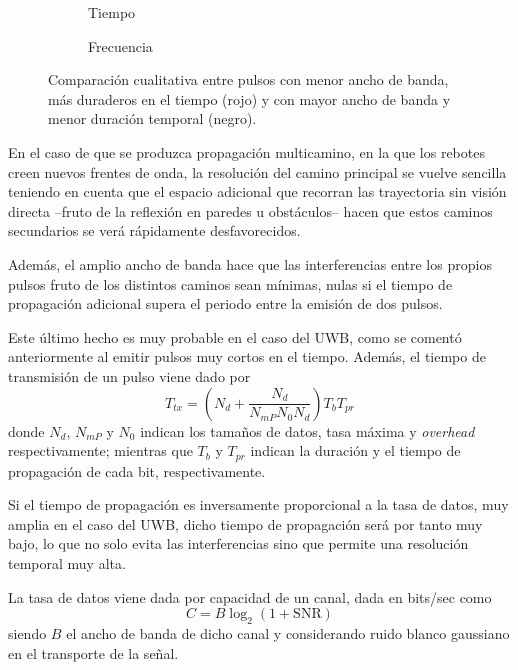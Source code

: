 \begin{figure}[H]
    \begin{subfigure}[b]{.5\textwidth}
      \centering
      \def\svgwidth{0.8\linewidth}
       
      \caption{Tiempo}
      \label{fig:forma_pulsos_tiempo}
    \end{subfigure}
    \begin{subfigure}[b]{.5\textwidth}
      \centering
      \def\svgwidth{0.8\linewidth}
      
      \caption{Frecuencia}
      \label{fig:forma_pulsos_frec}
    \end{subfigure}
    \caption{Comparación cualitativa entre pulsos con menor ancho de banda, más duraderos en el tiempo (rojo) y con mayor ancho de banda y menor duración temporal (negro).}
    \label{fig:forma_pulsos}
  \end{figure}

En el caso de que se produzca propagación multicamino, en la que los rebotes creen nuevos frentes de onda, la resolución del camino principal se vuelve sencilla teniendo en cuenta que el espacio adicional que recorran las trayectoria sin visión directa --fruto de la reflexión en paredes u obstáculos-- hacen que estos caminos secundarios se verá rápidamente desfavorecidos.

Además, el amplio ancho de banda hace que las interferencias entre los propios pulsos fruto de los distintos caminos sean mínimas, nulas si el tiempo de propagación adicional supera el periodo entre la emisión de dos pulsos.

Este último hecho es muy probable en el caso del UWB, como se comentó anteriormente al emitir pulsos muy cortos en el tiempo.
Además, el tiempo de transmisión de un pulso viene dado por\cite{MAIN}
\begin{equation}
    T_{tx} = \left(N_d + \frac{N_d}{N_{mP}N_{0}N_d} \right) T_b T_{pr}
\end{equation}
donde $N_d$, $N_{mP}$ y $N_{0}$ indican los tamaños de datos, tasa máxima y \textit{overhead} respectivamente;
mientras que $T_b$ y $T_{pr}$ indican la duración y el tiempo de propagación de cada bit, respectivamente.

Si el tiempo de propagación es inversamente proporcional a la tasa de datos, muy amplia en el caso del UWB, dicho tiempo de propagación será por tanto muy bajo, lo que no solo evita las interferencias sino que permite una resolución temporal muy alta.

La tasa de datos viene dada por capacidad de un canal, dada en bits/sec como\cite{MAIN}
\begin{equation}
    C = B\log_2(1 + \text{SNR})
\end{equation}
siendo $B$ el ancho de banda de dicho canal y considerando ruido blanco gaussiano en el transporte de la señal.

